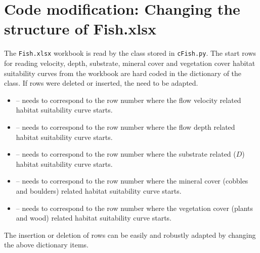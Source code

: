 \section{Code modification: Changing the structure of Fish.xlsx} \label{sec:hecode}

The \texttt{Fish.xlsx} workbook is read by the  class stored in \texttt{cFish.py}. The start rows for reading velocity, depth, substrate, mineral cover and vegetation cover habitat suitability curves from the workbook are hard coded in the  dictionary of the  class. If rows were deleted or inserted, the  need to be adapted.
\begin{itemize}
 \item {} --  needs to correspond to the row number where the flow velocity related habitat suitability curve starts.
 \item {} --  needs to correspond to the row number where the flow depth related habitat suitability curve starts.
 \item {} --  needs to correspond to the row number where the substrate related ($D$) habitat suitability curve starts.
 \item {} --  needs to correspond to the row number where the mineral cover (cobbles and boulders) related habitat suitability curve starts.
 \item {} --  needs to correspond to the row number where the vegetation cover (plants and wood) related habitat suitability curve starts.
\end{itemize}

The insertion or deletion of rows can be easily and robustly adapted by changing the above dictionary items.\\


